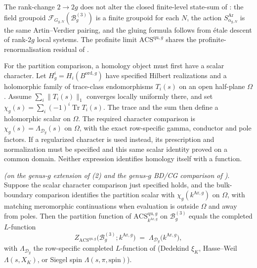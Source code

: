 \begin{remark}
\label{v4-arith:w9-r6:rem:rank-scaling}
The rank-change \(2\to 2g\) does not alter the closed finite-level
state-sum of : the field
groupoid
\(\mathcal{F}_{G_{g,N}}(\mathcal{B}_{g}^{(3)})\)
is a finite groupoid for each \(N\), the action
\(S_{\alpha_{g,N}}^{\mathrm{Ar}}\) is the same Artin--Verdier pairing,
and the gluing formula follows from \'etale descent of
rank-\(2g\) local systems. The profinite limit
\(\mathrm{ACS}^{\mathrm{qu},g}\) shares the profinite-renormalisation
residual of .
\end{remark}

For the partition comparison, a homology object must first have a
scalar character. Let $H^i_g=H_i(B^{\mathrm{ord},g})$ have specified
Hilbert realizations and a holomorphic family of trace-class
endomorphisms $T_i(s)$ on an open half-plane $\Omega$.
Assume $\sum_i\|T_i(s)\|_1$ converges locally uniformly there, and set
$\chi_g(s)=\sum_i(-1)^i\operatorname{Tr}T_i(s)$.
The trace and the sum then define a holomorphic scalar on $\Omega$.
The required character comparison is
$\chi_g(s)=\Lambda_{\mathcal D_g}(s)$ on $\Omega$, with the exact
row-specific gamma, conductor and pole factors. If a regularized
character is used instead, its prescription and normalization must
be specified and this same scalar identity proved on a common domain.
Neither expression identifies homology itself with a function.

\begin{proposition}
\label{v4-arith:w9-r6:prop:partition-g}
\ClaimStatusConditional \emph{(on the genus-\(g\) extension of
(2) and the genus-\(g\) BD/CG
comparison of )}.
Suppose the scalar character comparison just specified holds, and
the bulk-boundary comparison identifies the partition scalar with
$\chi_g(k^{\mathrm{Ar},g})$ on $\Omega$, with matching meromorphic
continuations when evaluation is outside $\Omega$ and away from poles.
Then the partition function of
\(\mathrm{ACS}^{\mathrm{qu},g}_{k^{\mathrm{Ar},g}}\) on
\(\mathcal{B}_{g}^{(3)}\) equals the completed \(L\)-function
\begin{equation}
\label{v4-arith:w9-r6:eq:partition-g}
Z_{\mathrm{ACS}^{\mathrm{qu},g}}\bigl(\mathcal{B}_{g}^{(3)};k^{\mathrm{Ar},g}\bigr)
\;=\;\Lambda_{\mathcal{D}_{g}}\bigl(k^{\mathrm{Ar},g}\bigr),
\end{equation}
with \(\Lambda_{\mathcal{D}_{g}}\) the row-specific completed \(L\)-function
of  (Dedekind \(\xi_{K}\), Hasse--Weil
\(\Lambda(s,X_{K})\), or Siegel spin \(\Lambda(s,\pi,\mathrm{spin})\)).
\end{proposition}

